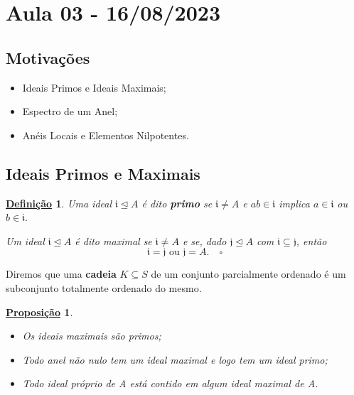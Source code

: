 \documentclass{article}
\newtheorem*{def*}{\underline{Defini\c c\~ao}}
\newtheorem*{prop*}{\underline{Proposi\c c\~ao}}
\begin{document}
\section{Aula 03 - 16/08/2023}
\subsection{Motivações}
\begin{itemize}
  \item Ideais Primos e Ideais Maximais;
  \item Espectro de um Anel;
  \item Anéis Locais e Elementos Nilpotentes.
\end{itemize}
\subsection{Ideais Primos e  Maximais}
\begin{def*}
  Uma ideal \(\mathfrak{i} \trianglelefteq{A}\) é dito \textbf{primo} se \(\mathfrak{i}\neq A\) e \(ab\in \mathfrak{i}\)
implica \(a\in \mathfrak{i}\) ou \(b\in \mathfrak{i}.\) 

  Um ideal \(\mathfrak{i}\trianglelefteq{A}\) é dito maximal se \(\mathfrak{i}\neq A\) e se, dado \(\mathfrak{j}\trianglelefteq{A}\)
com \(\mathfrak{i}\subseteq{\mathfrak{j}}\), então 
  \[
    \mathfrak{i} = \mathfrak{j}\text{ ou } \mathfrak{j} = A.\quad\square
  \]
\end{def*}
  Diremos que uma \textbf{cadeia} \(K\subseteq{S}\) de um conjunto parcialmente ordenado é um subconjunto totalmente
ordenado do mesmo.
\begin{prop*}
 \begin{itemize}
  \item[1)] Os ideais maximais são primos;
  \item[2)] Todo anel não nulo tem um ideal maximal e logo tem um ideal primo;
  \item[3)] Todo ideal próprio de A está contido em algum ideal maximal de A.
 \end{itemize}
\end{prop*}
\end{document}
